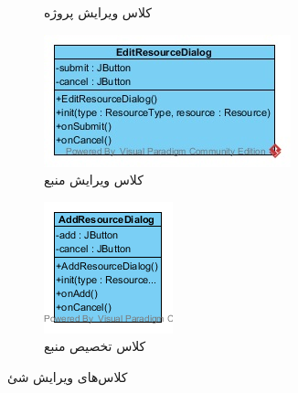 \begin{figure}[H]
\begin{subfigure}[b]{0.3\textwidth}
		\caption{کلاس ویرایش پروژه}
	\end{subfigure}
	\begin{subfigure}[b]{0.3\textwidth}
		\includegraphics[width=\textwidth]{img/class-design/ui/EditResourceDialog.jpg}
		\caption{کلاس ویرایش منبع}
	\end{subfigure}
	\begin{subfigure}[b]{0.3\textwidth}
		\includegraphics[width=\textwidth]{img/class-design/ui/AddResourceDialog.png}
		\caption{کلاس تخصیص منبع}
	\end{subfigure}
	\caption{کلاس‌های ویرایش شئ}
\end{figure}

